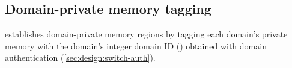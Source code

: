 \fi










\subsection{Domain-private memory tagging}
%
\thename establishes domain-private memory regions by tagging each domain's private memory with the domain's integer domain ID () obtained with domain authentication (\cref{sec:design:switch-auth}).

